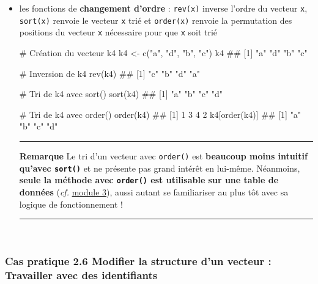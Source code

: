 \documentclass[12pt,twosided, notitlepage]{book}
\newenvironment{Shaded}{}{}
\newcommand{\KeywordTok}[1]{\textcolor[rgb]{0.00,0.00,1.00}{#1}}
\newcommand{\StringTok}[1]{\textcolor[rgb]{0.00,0.50,0.50}{#1}}
\newcommand{\CommentTok}[1]{\textcolor[rgb]{0.00,0.50,0.00}{#1}}
\newcommand{\NormalTok}[1]{#1}
\renewenvironment{Shaded}{\begin{snugshade}}{\end{snugshade}}
\begin{document}
\begin{itemize}
\item
  les fonctions de \textbf{changement d'ordre} :
  \texttt{rev(x)} inverse l'ordre du vecteur
  \texttt{x}, \texttt{sort(x)} renvoie le
  vecteur \texttt{x} trié et
  \texttt{order(x)} renvoie la permutation
  des positions du vecteur \texttt{x} nécessaire pour que \texttt{x}
  soit trié

\begin{Shaded}
\begin{Highlighting}[]
\CommentTok{# Création du vecteur k4}
\NormalTok{k4 <-}\StringTok{ }\KeywordTok{c}\NormalTok{(}\StringTok{"a"}\NormalTok{, }\StringTok{"d"}\NormalTok{, }\StringTok{"b"}\NormalTok{, }\StringTok{"c"}\NormalTok{)}
\NormalTok{k4}
\NormalTok{  ## [1] "a" "d" "b" "c"}

\CommentTok{# Inversion de k4}
\KeywordTok{rev}\NormalTok{(k4)}
\NormalTok{  ## [1] "c" "b" "d" "a"}

\CommentTok{# Tri de k4 avec sort()}
\KeywordTok{sort}\NormalTok{(k4)}
\NormalTok{  ## [1] "a" "b" "c" "d"}

\CommentTok{# Tri de k4 avec order()}
\KeywordTok{order}\NormalTok{(k4)}
\NormalTok{  ## [1] 1 3 4 2}
\NormalTok{k4[}\KeywordTok{order}\NormalTok{(k4)]}
\NormalTok{  ## [1] "a" "b" "c" "d"}
\end{Highlighting}
\end{Shaded}

  \begin{center}\rule{0.5\linewidth}{\linethickness}\end{center}

  \textbf{Remarque} Le tri d'un vecteur avec \texttt{order()} est
  \textbf{beaucoup moins intuitif qu'avec \texttt{sort()}} et ne
  présente pas grand intérêt en lui-même. Néanmoins, \textbf{seule la
  méthode avec \texttt{order()} est utilisable sur une table de données}
  (\emph{cf.} \underline{module 3}), aussi autant se familiariser au
  plus tôt avec sa logique de fonctionnement !

  \begin{center}\rule{0.5\linewidth}{\linethickness}\end{center}
\end{itemize}

~

\subsubsection{\texorpdfstring{\textbf{Cas pratique 2.6} Modifier la
structure d'un vecteur : Travailler avec des
identifiants}{Cas pratique 2.6 Modifier la structure d'un vecteur : Travailler avec des identifiants}}\label{cas-pratique-2.6-modifier-la-structure-dun-vecteur-travailler-avec-des-identifiants}
\end{document}
